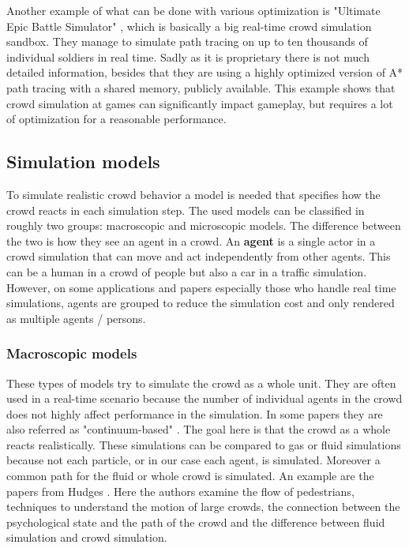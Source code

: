 \documentclass{acmsiggraph}               %
\begin{document}
Another example of what can be done with various optimization is "Ultimate Epic Battle Simulator" \cite{ultimeEpicBattleSim_video} , which is basically a big real-time crowd simulation sandbox. They manage to simulate path tracing on up to ten thousands of individual soldiers in real time. Sadly as it is proprietary there is not much detailed information, besides that they are using a highly optimized version of A* path tracing \label{term:A*Usage} with a shared memory, publicly available. 
This example shows that crowd simulation at games can significantly impact gameplay, but requires a lot of optimization for a reasonable performance.

\subsection{Simulation models}
\label{chap:simulationModels}
To simulate realistic crowd behavior a model is needed that specifies how the crowd reacts in each simulation step. The used models can be classified in roughly two groups: macroscopic and microscopic models. The difference between the two is how they see an agent in a crowd. An \textbf{agent} is a single actor in a crowd simulation that can move and act independently from other agents. This can be a human in a crowd of people but also a car in a traffic simulation. However, on some applications and papers especially those who handle real time simulations, agents are grouped to reduce the simulation cost and only rendered as multiple agents / persons.

\subsubsection{\textbf{Macroscopic models}}
These types of models try to simulate the crowd as a whole unit. They are often used in a real-time scenario because the number of individual agents in the crowd does not highly affect performance in the simulation. In some papers they are also referred as "continuum-based" \cite{xu_crowd_2014}. The goal here is that the crowd as a whole reacts realistically. These simulations can be compared to gas or fluid simulations because not each particle, or in our case each agent, is simulated. Moreover a common path for the fluid or whole crowd is simulated. An example are the papers from Hudges  . Here the authors examine the flow of pedestrians, techniques to understand the motion of large crowds, the connection between the psychological state and the path of the crowd and the difference between fluid simulation and crowd simulation.     
\end{document}
